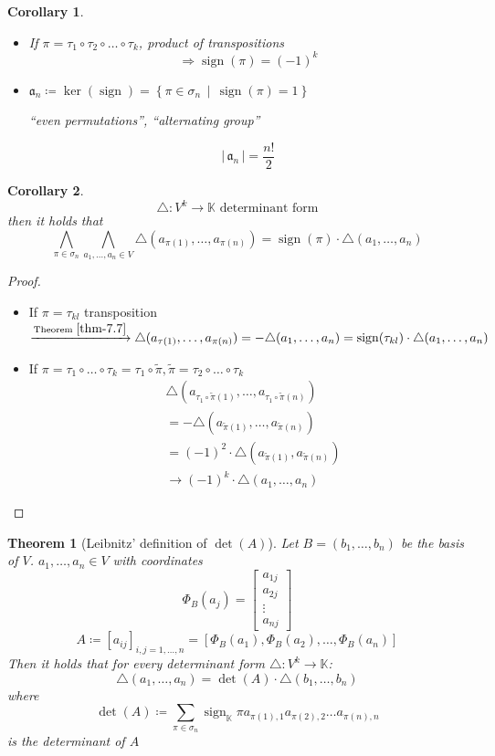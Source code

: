 \documentclass[a4paper,landscape,twocolumn]{article}
\newcommand\setdef[2]{\left\{#1\,\middle|\,#2\right\}}
\newcommand\card[1]{\left|\,#1\,\right|}
\newtheorem{theorem}{Theorem}
\newtheorem{cor}{Corollary}
\DeclareMathOperator\sign{sign}
\begin{document}
\begin{cor}
  \label{cor-7.18}
  \begin{itemize}
    \item If $\pi = \tau_1 \circ \tau_2 \circ \ldots \circ \tau_k$, product of transpositions
      \[ \Rightarrow \sign(\pi) = (-1)^k \]
    \item $\mathfrak a_n \coloneqq \ker(\sign) = \setdef{\pi \in \sigma_n}{\sign(\pi) = 1}$
      \begin{center} \enquote{even permutations}, \enquote{alternating group} \end{center}
      \[ \card{\mathfrak a_n} = \frac{n!}{2} \]
  \end{itemize}
\end{cor}
\begin{cor}
  \label{cor-7.19}
  \[ \triangle: V^k \to \mathbb K \text{ determinant form} \]
  then it holds that
  \[
    \bigwedge_{\pi \in \sigma_n} \bigwedge_{a_1, \ldots, a_n \in V}
    \triangle(a_{\pi(1)}, \ldots, a_{\pi(n)}) = \sign(\pi) \cdot \triangle(a_1, \ldots, a_n)
  \]
\end{cor}
\begin{proof}
  \begin{itemize}
    \item If $\pi = \tau_{kl}$ transposition $\xrightarrow{\text{Theorem~}\ref{thm-7.7}} \triangle(a_{\tau(1)}, \ldots, a_{\pi(n)})
      = -\triangle(a_1, \ldots, a_n) = \sign(\tau_{kl}) \cdot \triangle(a_1, \ldots, a_n)$
    \item If $\pi = \tau_1 \circ \ldots \circ \tau_k = \tau_1 \circ \tilde{\pi}, \tilde{\pi} = \tau_2 \circ \ldots \circ \tau_k$
      \begin{align*}
        &\triangle(a_{\tau_1 \circ \tilde{\pi}(1)}, \ldots, a_{\tau_1 \circ \tilde{\pi}(n)}) \\
        &= -\triangle(a_{\tilde\pi(1)}, \ldots, a_{\tilde\pi(n)}) \\
        &= (-1)^2 \cdot \triangle(a_{\tilde\pi(1)}, a_{\tilde\pi(n)}) \\
        &\to (-1)^k \cdot \triangle(a_1, \ldots, a_n)
      \end{align*}
  \end{itemize}
\end{proof}
\begin{theorem}[Leibnitz' definition of $\det(A)$]
  \label{satz-7.20}
  Let $B = (b_1, \ldots, b_n)$ be the basis of $V$. $a_1, \ldots, a_n \in V$ with coordinates
  \[ \Phi_B(a_j) = \begin{bmatrix} a_{1j} \\ a_{2j} \\ \vdots \\ a_{nj} \end{bmatrix} \]
  \[ A \coloneqq [a_{ij}]_{i,j=1,\ldots,n} = \left[\Phi_B(a_1), \Phi_B(a_2), \ldots, \Phi_B(a_n)\right] \]
  Then it holds that for every determinant form $\triangle: V^k \to \mathbb K$:
  \[ \triangle(a_1, \ldots, a_n) = \det(A) \cdot \triangle(b_1, \ldots, b_n) \]
  where
  \[ \det(A) \coloneqq \sum_{\pi \in \sigma_n} \sign_{\mathbb K} \pi a_{\pi(1),1} a_{\pi(2),2} \ldots a_{\pi(n),n} \]
  is the determinant of $A$
\end{theorem}
\end{document}
